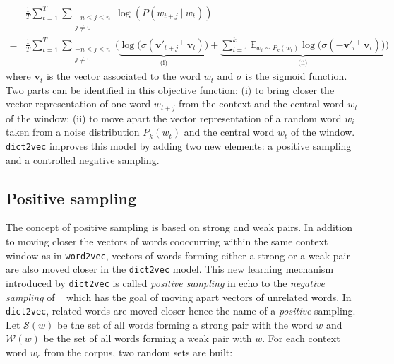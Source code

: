   \begin{equation}
    \label{ch05:eq:w2v-sgns}
    \begin{split}
      & \frac{1}{T} \sum_{t=1}^T \sum_{\substack{-n \leq j \leq n \\ j \neq 0}}
      \log ( P(w_{t+j}~|~w_t)) \\
    = & \frac{1}{T} \sum_{t=1}^T \sum_{\substack{-n \leq j \leq n \\ j \neq 0}}
      \Big(
        \underbrace{
        \log \big( \sigma(\mathbf{v'}_{t+j}{}^\top~\mathbf{v}_{t})\big)}_\text{(i)}
      + \underbrace{\sum_{i=1}^k \mathbb{E}_{w_i \sim P_k(w_t)}
        \log \big( \sigma(\mathbf{-v'}_{i} {}^\top~\mathbf{v}_{t})\big)}_\text{(ii)}
      \Big)
    \end{split}
  \end{equation}
  where $\mathbf{v}_t$ is the vector associated to the word $w_t$ and $\sigma$
  is the sigmoid function. Two parts can be identified in this objective
  function: (i) to bring closer the vector representation of one word $w_{t+j}$
  from the context and the central word $w_t$ of the window; (ii) to move apart
  the vector representation of a random word $w_i$ taken from a noise
  distribution $P_k(w_t)$ and the central word $w_t$ of the window.
  \texttt{dict2vec} improves this model by adding two new elements: a positive
  sampling and a controlled negative sampling.

  \subsection{Positive sampling}
    \label{ch05:subsec:positive-sampling}
    The concept of positive sampling is based on strong and weak pairs. In
    addition to moving closer the vectors of words cooccurring within the same
    context window as in \texttt{word2vec}, vectors of words forming either a
    strong or a weak pair are also moved closer in the \texttt{dict2vec} model.
    This new learning mechanism introduced by \texttt{dict2vec} is called
    \textit{positive sampling} in echo to the \textit{negative sampling} of
    \citeauthor{mikolov2013efficient}~\citep{mikolov2013efficient} which has the
    goal of moving apart vectors of unrelated words. In \texttt{dict2vec},
    related words are moved closer hence the name of a \textit{positive}
    sampling. Let $\mathcal{S}(w)$ be the set of all words forming a strong pair
    with the word $w$ and $\mathcal{W}(w)$ be the set of all words forming a
    weak pair with $w$. For each context word $w_c$ from the corpus, two random
    sets are built:

